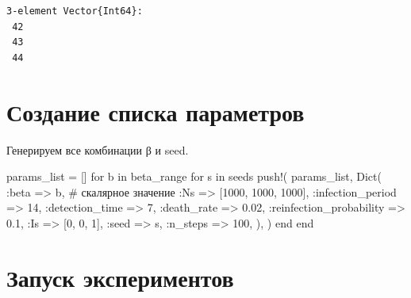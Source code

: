 \documentclass[
  12pt,
  a4paper,
  DIV=11,
  numbers=noendperiod]{scrreprt}
\newenvironment{Shaded}{\begin{snugshade}}{\end{snugshade}}
\newcommand{\CommentTok}[1]{\textcolor[rgb]{0.37,0.37,0.37}{#1}}
\newcommand{\ControlFlowTok}[1]{\textcolor[rgb]{0.00,0.23,0.31}{#1}}
\newcommand{\FloatTok}[1]{\textcolor[rgb]{0.68,0.00,0.00}{#1}}
\newcommand{\FunctionTok}[1]{\textcolor[rgb]{0.28,0.35,0.67}{#1}}
\newcommand{\KeywordTok}[1]{\textcolor[rgb]{0.00,0.23,0.31}{#1}}
\newcommand{\NormalTok}[1]{\textcolor[rgb]{0.00,0.23,0.31}{#1}}
\newcommand{\OperatorTok}[1]{\textcolor[rgb]{0.37,0.37,0.37}{#1}}
\begin{document}
\begin{verbatim}
3-element Vector{Int64}:
 42
 43
 44
\end{verbatim}

\section{Создание списка
параметров}\label{ux441ux43eux437ux434ux430ux43dux438ux435-ux441ux43fux438ux441ux43aux430-ux43fux430ux440ux430ux43cux435ux442ux440ux43eux432-1}

Генерируем все комбинации β и seed.

\begin{Shaded}
\begin{Highlighting}[]
\NormalTok{params\_list }\OperatorTok{=}\NormalTok{ []}
\ControlFlowTok{for}\NormalTok{ b }\KeywordTok{in}\NormalTok{ beta\_range}
    \ControlFlowTok{for}\NormalTok{ s }\KeywordTok{in}\NormalTok{ seeds}
        \FunctionTok{push!}\NormalTok{(}
\NormalTok{            params\_list,}
            \FunctionTok{Dict}\NormalTok{(}
                \OperatorTok{:}\NormalTok{beta }\OperatorTok{=\textgreater{}}\NormalTok{ b,               }\CommentTok{\# скалярное значение}
                \OperatorTok{:}\NormalTok{Ns }\OperatorTok{=\textgreater{}}\NormalTok{ [}\FloatTok{1000}\NormalTok{, }\FloatTok{1000}\NormalTok{, }\FloatTok{1000}\NormalTok{],}
                \OperatorTok{:}\NormalTok{infection\_period }\OperatorTok{=\textgreater{}} \FloatTok{14}\NormalTok{,}
                \OperatorTok{:}\NormalTok{detection\_time }\OperatorTok{=\textgreater{}} \FloatTok{7}\NormalTok{,}
                \OperatorTok{:}\NormalTok{death\_rate }\OperatorTok{=\textgreater{}} \FloatTok{0.02}\NormalTok{,}
                \OperatorTok{:}\NormalTok{reinfection\_probability }\OperatorTok{=\textgreater{}} \FloatTok{0.1}\NormalTok{,}
                \OperatorTok{:}\NormalTok{Is }\OperatorTok{=\textgreater{}}\NormalTok{ [}\FloatTok{0}\NormalTok{, }\FloatTok{0}\NormalTok{, }\FloatTok{1}\NormalTok{],}
                \OperatorTok{:}\NormalTok{seed }\OperatorTok{=\textgreater{}}\NormalTok{ s,}
                \OperatorTok{:}\NormalTok{n\_steps }\OperatorTok{=\textgreater{}} \FloatTok{100}\NormalTok{,}
\NormalTok{            ),}
\NormalTok{        )}
    \ControlFlowTok{end}
\ControlFlowTok{end}
\end{Highlighting}
\end{Shaded}

\section{Запуск
экспериментов}\label{ux437ux430ux43fux443ux441ux43a-ux44dux43aux441ux43fux435ux440ux438ux43cux435ux43dux442ux43eux432-1}
\end{document}
